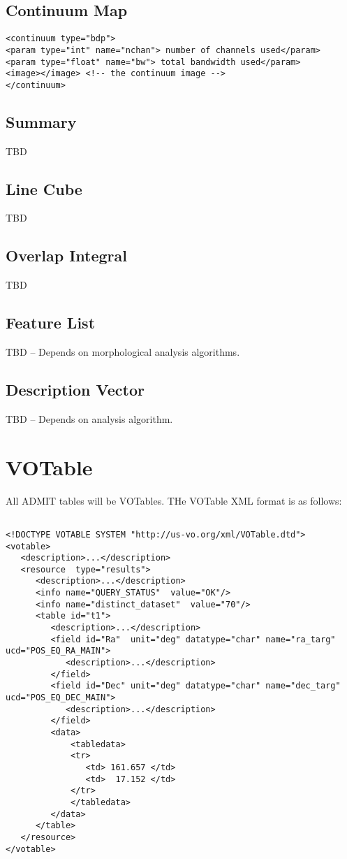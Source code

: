 \documentclass{article}
\begin{document}
\subsection{Continuum Map}
\footnotesize
\begin{verbatim}
<continuum type="bdp">
<param type="int" name="nchan"> number of channels used</param>
<param type="float" name="bw"> total bandwidth used</param>
<image></image> <!-- the continuum image -->
</continuum>
\end{verbatim}
\normalsize

\subsection{Summary}
TBD

\subsection{Line Cube}
TBD

\subsection{Overlap Integral}
TBD

\subsection{Feature List}
TBD -- Depends on morphological analysis algorithms.

\subsection{Description Vector}
TBD -- Depends on analysis algorithm.

\newpage
\section{VOTable}

All ADMIT tables will be VOTables. THe VOTable XML format is as follows:

\footnotesize
\begin{verbatim}

<!DOCTYPE VOTABLE SYSTEM "http://us-vo.org/xml/VOTable.dtd">
<votable>
   <description>...</description>
   <resource  type="results">
      <description>...</description>
      <info name="QUERY_STATUS"  value="OK"/>
      <info name="distinct_dataset"  value="70"/>
      <table id="t1">
         <description>...</description>
         <field id="Ra"  unit="deg" datatype="char" name="ra_targ"  ucd="POS_EQ_RA_MAIN"> 
            <description>...</description>
         </field>
         <field id="Dec" unit="deg" datatype="char" name="dec_targ" ucd="POS_EQ_DEC_MAIN">
            <description>...</description>
         </field>
         <data>
             <tabledata>
             <tr>
                <td> 161.657 </td>
                <td>  17.152 </td>
             </tr>
             </tabledata>
         </data>
      </table>
   </resource>
</votable>

\end{verbatim}
\normalsize
\end{document}

